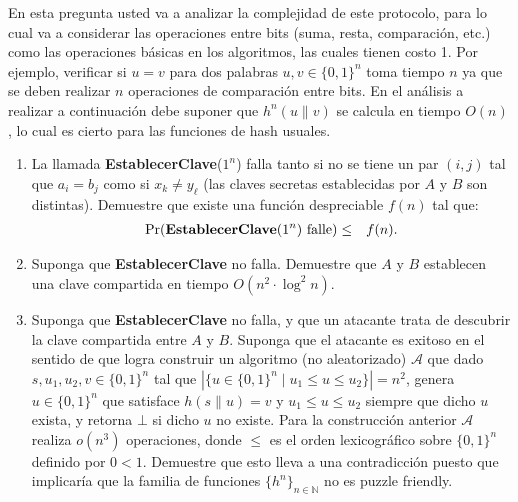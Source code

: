En esta pregunta usted va a analizar la complejidad de este protocolo,
para lo cual va a considerar las operaciones entre bits (suma, resta,
comparación, etc.) como las operaciones básicas en los algoritmos, las
cuales tienen costo 1. Por ejemplo, verificar si $u = v$ para dos
palabras $u, v \in \{0,1\}^n$ toma tiempo $n$ ya que se deben realizar
$n$ operaciones de comparación entre bits. En el análisis a realizar a
continuación debe suponer que $h^n(u \| v)$ se calcula en tiempo
$O(n)$, lo cual es cierto para las funciones de hash usuales.
\begin{enumerate}
\item La llamada {\bf EstablecerClave}($1^n$) falla tanto si no se tiene un par $(i, j)$ tal que $a_i = b_j$ como si $x_k \neq y_\ell$ (las claves secretas establecidas por $A$ y $B$ son distintas). Demuestre que existe una función despreciable $f(n)$ tal que:
\begin{eqnarray*}
\Pr(\text{{\bf EstablecerClave}($1^n$) falle}) & \leq & f(n).
\end{eqnarray*}

\item Suponga que {\bf EstablecerClave} no falla. Demuestre que $A$ y $B$ establecen una clave compartida en tiempo $O(n^2 \cdot \log^2 n)$.

\item Suponga que {\bf EstablecerClave} no falla, y que un atacante trata de descubrir la clave compartida entre $A$ y $B$. Suponga que el atacante es exitoso en el sentido de que logra construir un algoritmo (no aleatorizado) $\mathcal{A}$ que dado $s, u_1, u_2, v \in \{0,1\}^n$ tal que $|\{ u \in \{0, 1\}^n \mid u_1 \leq u \leq u_2 \}| = n^2$, genera $u \in \{0,1\}^n$ que satisface $h(s \| u) = v$ y $u_1 \leq u \leq u_2$ siempre que dicho $u$ exista, y retorna $\bot$ si dicho $u$ no existe. Para la construcción anterior $\mathcal{A}$ realiza $o(n^3)$ operaciones, donde $\leq$ es el orden lexicográfico sobre $\{0,1\}^n$ definido por $0 < 1$. Demuestre que esto lleva a una contradicción puesto que implicaría que la familia de funciones $\{h^n\}_{n \in \mathbb{N}}$ no es puzzle friendly.


\end{enumerate}




